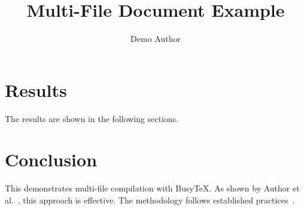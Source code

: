 \documentclass{article}
\title{Multi-File Document Example}
\author{Demo Author}
\begin{document}
\maketitle




\section{Results}
The results are shown in the following sections.



\section{Conclusion}
This demonstrates multi-file compilation with BusyTeX.
As shown by Author et al.~\cite{sample2023}, this approach is effective.
The methodology follows established practices~\cite{example2022}.



\end{document}
